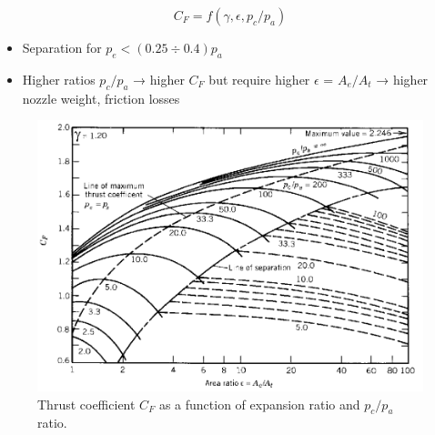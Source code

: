 \documentclass[
  ignorenonframetext,
]{beamer}
\providecommand{\tightlist}{%
  \setlength{\itemsep}{0pt}\setlength{\parskip}{0pt}}\usepackage{longtable,booktabs,array}
\begin{document}
\begin{frame}
\[C_F = f(\gamma, \epsilon, p_c/p_a)\]

\begin{itemize}
\tightlist
\item
  Separation for \(p_e < (0.25 ÷ 0.4) p_a\)
\item
  Higher ratios \(p_c/p_a\) → higher \(C_F\) but require higher
  \(\epsilon\) = \(A_e/A_t\) → higher nozzle weight, friction losses
\end{itemize}
\end{frame}

\begin{frame}
\begin{figure}

{\centering \includegraphics{figs/fig16.5.png}

}

\caption{Thrust coefficient \(C_F\) as a function of expansion ratio and
\(p_c/p_a\) ratio.}

\end{figure}
\end{frame}
\end{document}
